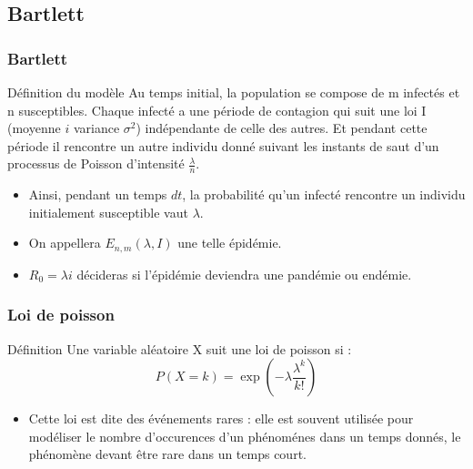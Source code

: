 \subsection{Bartlett}

\begin{frame}
    \frametitle{Bartlett}

    \begin{block}{Définition du modèle}
        Au temps initial, la population se compose de m infectés et n susceptibles. Chaque infecté a une période de contagion qui suit une loi I (moyenne $i$ variance $\sigma^2$) indépendante de celle des autres. Et pendant cette période il rencontre un autre individu donné suivant les instants de saut d’un processus de Poisson d’intensité $\frac{\lambda}{n}$.
    \end{block}

    \begin{itemize}
        \item Ainsi, pendant un temps $dt$, la probabilité qu’un infecté rencontre un individu initialement susceptible vaut $\lambda$.
        \item On appellera $E_{n,m}(\lambda, I)$ une telle épidémie.
        \item $R_0 = \lambda i$ décideras si l'épidémie deviendra une pandémie ou endémie.
    \end{itemize}

\end{frame}

\begin{frame}
    \frametitle{Loi de poisson}

    \begin{block}{Définition}
        Une variable aléatoire X suit une loi de poisson si :
        $$ P(X=k) = \exp(-\lambda \frac{\lambda^k}{k!}) $$
    \end{block}

    \begin{itemize}
        \item Cette loi est dite des événements rares : elle est souvent utilisée pour modéliser le nombre d'occurences d'un phénoménes dans un temps donnés, le phénomène devant être rare dans un temps court.
    \end{itemize}

\end{frame}
